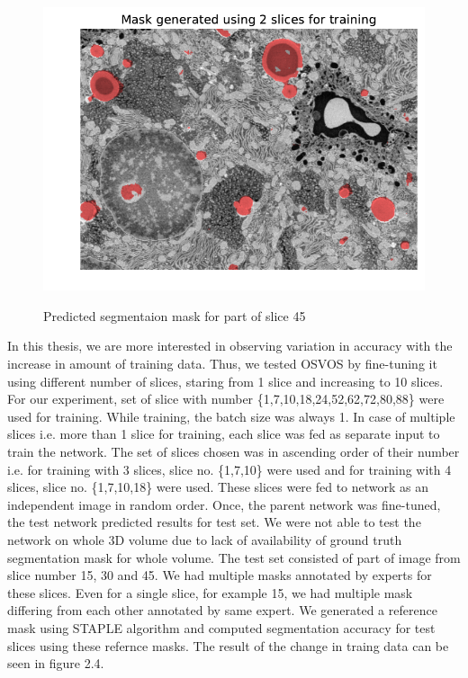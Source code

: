 \begin{figure}[h!]\label{fig:cnnslices}
\centering
\includegraphics[width=0.9\linewidth]{figures/cnn_mask_2slice.pdf} \\
\caption{Predicted segmentaion mask for part of slice 45}
\end{figure}

In this thesis, we are more interested in observing variation in accuracy with the increase in amount of training data. Thus, we tested OSVOS by fine-tuning it using different number of slices, staring from 1 slice and increasing to 10 slices. For our experiment, set of slice with number \{1,7,10,18,24,52,62,72,80,88\} were used for training. While training, the batch size was always 1. In case of multiple slices i.e. more than 1 slice for training, each slice was fed as separate input to train the network. The set of slices chosen was in ascending order of their number i.e. for training with 3 slices, slice no. \{1,7,10\} were used and for training with 4 slices, slice no. \{1,7,10,18\} were used. These slices were fed to network as an independent image in random order. Once, the parent network was fine-tuned, the test network predicted results for test set. We were not able to test the network on whole 3D volume due to lack of availability of ground truth segmentation mask for whole volume. The test set consisted of part of image from slice number 15, 30 and 45. We had multiple masks annotated by experts for these slices. Even for a single slice, for example 15, we had multiple mask differing from each other annotated by same expert. We generated a reference mask using STAPLE algorithm and computed segmentation accuracy for test slices using these refernce masks. The result of the change in traing data can be seen in figure 2.4.

